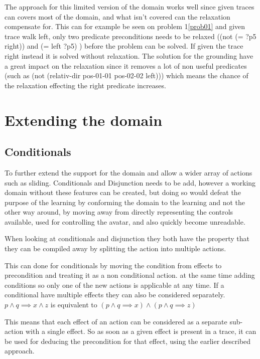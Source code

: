 The approach for this limited version of the domain works well since given traces can covers most of the domain, and what isn't covered can the relaxation compensate for. This can for example be seen on problem 1\ref{prob01} and given trace walk left, only two predicate preconditions needs to be relaxed ((not (= ?p5 right)) and (= left ?p5) ) before the problem can be solved. If given the trace right instead it is solved without relaxation. The solution for the grounding have a great impact on the relaxation since it removes a lot of non useful predicates (such as (not (relativ-dir pos-01-01 pos-02-02 left))) which means the chance of the relaxation effecting the right predicate increases.


\section{Extending the domain}
\subsection{Conditionals}	

	To further extend the support for the domain and allow a wider array of actions such as sliding. Conditionals and Disjunction needs to be add, however a working domain without these features can be created, but doing so would defeat the purpose of the learning by conforming the domain to the learning and not the other way around, by moving away from directly representing the controls available, used for controlling the avatar, and also quickly become unreadable.

	When looking at conditionals and disjunction they both have the property that they can be compiled away by splitting the action into multiple actions. %
	
	This can done for conditionals by moving the condition from effects to precondition and treating it as a non conditional action. at the same time adding conditions so only one of the new actions is applicable at any time. If a conditional have multiple effects they can also be considered separately.
	$p \land q \implies x \land z$
	is equivalent to 
	$(p \land q \implies x)
	\land
	(p \land q \implies z)$
	
	
	This means that each effect of an action can be considered as a separate sub-action with a single effect. So as soon as a given effect is present in a trace, it can be used for deducing the precondition for that effect, using the earlier described approach. 
	
